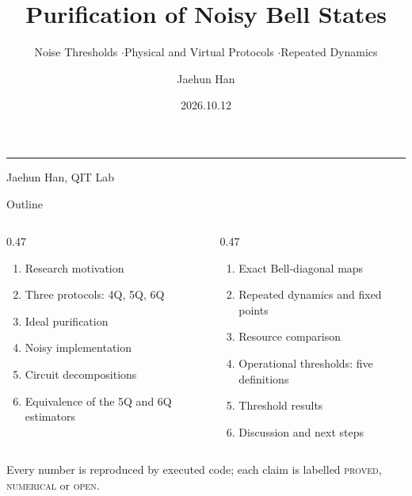 \documentclass[aspectratio=169,10pt,t]{beamer}
\title{Purification of Noisy Bell States}
\subtitle{Noise Thresholds \quad$\cdot$\quad Physical and Virtual Protocols
          \quad$\cdot$\quad Repeated Dynamics}
\author{Jaehun Han}
\institute{QIT Lab}
\date{2026.10.12}
\begin{document}
\begin{frame}[plain]
  \vspace{0.26\paperheight}
  {\inserttitle\par}
  \vspace{1.2ex}
  {\color{qitrule}\rule{0.40\paperwidth}{1.2pt}}\par
  \vspace{1.8ex}
  {\insertsubtitle\par}
  \vspace{0.21\paperheight}
  {%
   \insertdate\quad Jaehun Han, QIT Lab\par}
\end{frame}

\begin{frame}{Outline}
  \vspace{1.5ex}
  \begin{columns}[T,onlytextwidth]
  \begin{column}{0.47\textwidth}\vspace{0pt}
    \small
    \begin{enumerate}\itemsep0.80ex
      \item Research motivation
      \item Three protocols: 4Q, 5Q, 6Q
      \item Ideal purification
      \item Noisy implementation
      \item Circuit decompositions
      \item Equivalence of the 5Q and 6Q estimators
    \end{enumerate}
  \end{column}
  \begin{column}{0.47\textwidth}\vspace{0pt}
    \small
    \begin{enumerate}\itemsep0.80ex
      \setcounter{enumi}{6}
      \item Exact Bell-diagonal maps
      \item Repeated dynamics and fixed points
      \item Resource comparison
      \item Operational thresholds: five definitions
      \item Threshold results
      \item Discussion and next steps
    \end{enumerate}
  \end{column}
  \end{columns}
  \vfill
  {\footnotesize\color{qitgray}
   Every number is reproduced by executed code; each claim is labelled
   \textsc{proved}, \textsc{numerical} or \textsc{open}.}
  \vspace{1ex}
\end{frame}
\end{document}

